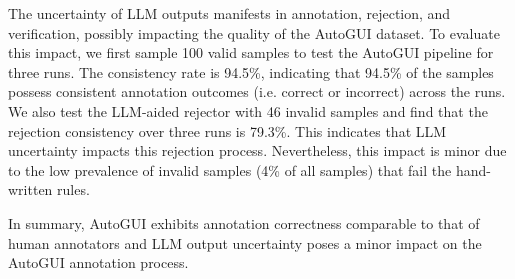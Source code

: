  The uncertainty of LLM outputs manifests in annotation, rejection, and verification, possibly impacting the quality of the AutoGUI dataset. To evaluate this impact, we first sample 100 valid samples to test the AutoGUI pipeline for three runs. The consistency rate is 94.5\%, indicating that 94.5\% of the samples possess consistent annotation outcomes (i.e. correct or incorrect) across the runs. We also test the LLM-aided rejector with 46 invalid samples and find that the rejection consistency over three runs is 79.3\%. This indicates that LLM uncertainty impacts this rejection process. Nevertheless, this impact is minor due to the low prevalence of invalid samples (4\% of all samples) that fail the hand-written rules.

In summary, AutoGUI exhibits annotation correctness comparable to that of human annotators and LLM output uncertainty poses a minor impact on the AutoGUI annotation process.







